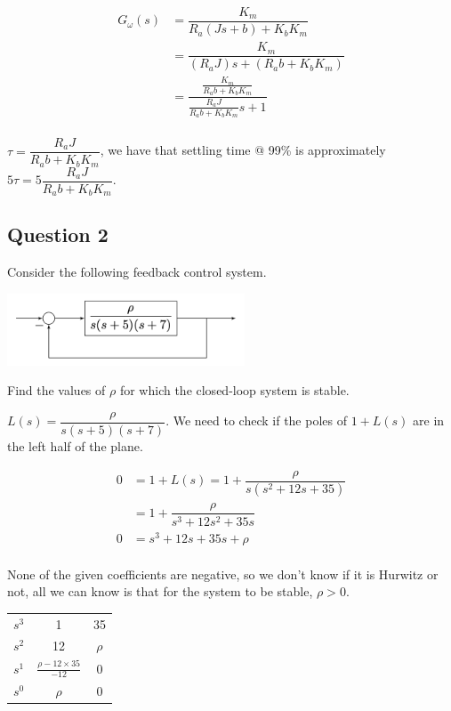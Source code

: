 \documentclass[11pt]{article}
\begin{document}
\begin{align*}
  G_\omega(s) &= \dfrac{K_m}{R_a (Js + b) + K_b K_m} \\
  &= \dfrac{K_m}{(R_a J) s + (R_a b + K_b K_m)} \\
  &= \dfrac{\frac{K_m}{R_a b + K_b K_m}}{\frac{R_a J}{R_a b + K_b K_m} s + 1} \\
\end{align*}

$\tau = \dfrac{R_a J}{R_a b + K_b K_m}$, we have that settling time @ 99\% is approximately $5 \tau = 5 \dfrac{R_a J}{R_a b + K_b K_m}$.

\subsection{Question 2}

Consider the following feedback control system.

\includegraphics[width=200pt]{a3_q2.png}

Find the values of $\rho$ for which the closed-loop system is stable.

$L(s) = \dfrac{\rho}{s(s + 5)(s + 7)}$. We need to check if the poles of $1 + L(s)$ are in the left half of the plane.

\begin{align*}
  0 &= 1 + L(s) = 1 + \dfrac{\rho}{s(s^2 + 12s + 35)} \\
  &= 1 + \dfrac{\rho}{s^3 + 12s^2 + 35s} \\
  0 &= s^3 + 12s + 35s + \rho \\
\end{align*}

None of the given coefficients are negative, so we don't know if it is Hurwitz or not, all we can know is that for the system to be stable, $\rho > 0$.

\begin{table}[h]
  \centering
  \begin{tabular}{|c|c|c|}
  \hline
  $s^3$ & 1 & 35 \\
  $s^2$ & 12 & $\rho$ \\
  $s^1$ & $\frac{\rho - 12 \times 35}{-12}$ & 0 \\
  $s^0$ & $\rho$ & 0 \\
  \hline
  \end{tabular}
\end{table}
\end{document}
